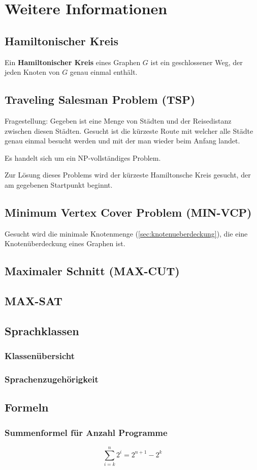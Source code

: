 \chapter{Weitere Informationen}
\section{Hamiltonischer Kreis}
Ein \textbf{Hamiltonischer Kreis} eines Graphen $G$ ist ein geschlossener Weg, der jeden Knoten von $G$ genau einmal enthält.

\section{Traveling Salesman Problem (TSP)}
Fragestellung: Gegeben ist eine Menge von Städten und der Reisedistanz zwischen diesen Städten. Gesucht ist die kürzeste Route mit welcher alle Städte genau einmal besucht werden und mit der man wieder beim Anfang landet.

Es handelt sich um ein NP-vollständiges Problem.

Zur Lösung dieses Problems wird der kürzeste Hamiltonsche Kreis gesucht, der am gegebenen Startpunkt beginnt.

\section{Minimum Vertex Cover Problem (MIN-VCP)}
Gesucht wird die minimale Knotenmenge (\ref{sec:knotenueberdeckung}), die eine Knotenüberdeckung eines Graphen ist.

\section{Maximaler Schnitt (MAX-CUT)}

\section{MAX-SAT}

\section{Sprachklassen}
\subsection{Klassenübersicht}

\subsection{Sprachenzugehörigkeit}

\section{Formeln}
\subsection{Summenformel für Anzahl Programme}
\[
\sum_{i = k}^n 2^i = 2^{n+1} - 2^k
\]
